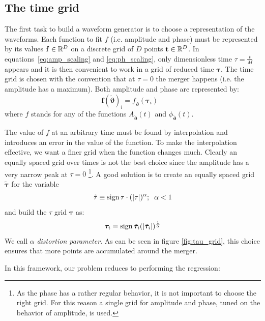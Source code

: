 \subsection{The time grid}
The first task to build a waveform generator is to choose a representation of the waveforms. Each function to fit $f$ (i.e. amplitude and phase) must be represented by its values $\mathbf{f} \in \mathbb{R}^D$ on a discrete grid of $D$ points $\mathbf{t} \in \mathbb{R}^D$.
In equations~\eqref{eq:amp_scaling} and \eqref{eq:ph_scaling}, only dimensionless time $\tau=\frac{t}{M}$ appears and it is then convenient to work in a grid of reduced time $\boldsymbol{\tau}$. The time grid is chosen with the convention that at $\tau=0$ the merger happens (i.e. the amplitude has a maximum).
Both amplitude and phase are represented by:
\begin{equation}
	\mathbf{f}({\tilde{\boldsymbol{\vartheta}}})_i = f_{{\tilde{\boldsymbol{\vartheta}}}}(\boldsymbol{\tau}_i) \;\;\; 
\end{equation}
where $f$ stands for any of the functions $A_{\tilde{\boldsymbol{\vartheta}}}(t)$ and ${\phi}_{\tilde{\boldsymbol{\vartheta}}}(t)$.
\par
The value of $f$ at an arbitrary time must be found by interpolation and introduces an error in the value of the function.
To make the interpolation effective, we want a finer grid when the function changes much.
Clearly an equally spaced grid over times is not the best choice since the amplitude has a very narrow peak at $\tau=0$
\footnote{As the phase has a rather regular behavior, it is not important to choose the right grid. For this reason a single grid for amplitude and phase, tuned on the behavior of amplitude, is used.}.
A good solution is to create an equally spaced grid $\boldsymbol{\tilde{\tau}}$ for the variable
\begin{equation} \label{eq:tau_tilde}
	{\tilde{\tau}} \equiv \operatorname{sign}{\tau} \cdot (|\tau|)^\alpha ;\;\; \alpha < 1
\end{equation}
and build the $\tau$ grid ${\boldsymbol{\tau}}$ as:
\begin{equation} \label{eq:tau_grid}
	{\boldsymbol{\tau}}_i = \operatorname{sign}{\boldsymbol{\tilde{\tau}}_i} (|\boldsymbol{\tilde{\tau}}_i|)^{\frac{1}{\alpha}}
\end{equation}
We call $\alpha$ \textit{distortion parameter}.
As can be seen in figure \ref{fig:tau_grid}, this choice ensures that more points are accumulated around the merger.
\par
In this framework, our problem reduces to performing the regression:
